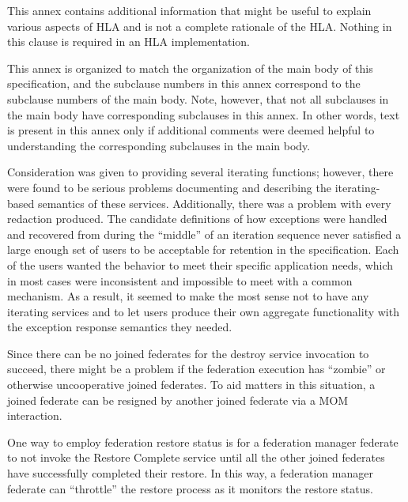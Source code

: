 
\clearpage

\begin{annexstdpage}


    This annex contains additional information that might be useful to explain various aspects of HLA and is not a complete rationale of the HLA. Nothing in this clause is required in an HLA implementation.

    This annex is organized to match the organization of the main body of this specification, and the subclause numbers in this annex correspond to the subclause numbers of the main body. Note, however, that not all subclauses in the main body have corresponding subclauses in this annex. In other words, text is present in this annex only if additional comments were deemed helpful to understanding the corresponding subclauses in the main body.


    Consideration was given to providing several iterating functions; however, there were found to be serious problems documenting and describing the iterating-based semantics of these services. Additionally, there was a problem with every redaction produced. The candidate definitions of how exceptions were handled and recovered from during the ``middle'' of an iteration sequence never satisfied a large enough set of users to be acceptable for retention in the specification. Each of the users wanted the behavior to meet their specific application needs, which in most cases were inconsistent and impossible to meet with a common mechanism. As a result, it seemed to make the most sense not to have any iterating services and to let users produce their own aggregate functionality with the exception response semantics they needed.



    Since there can be no joined federates for the destroy service invocation to succeed, there might be a problem if the federation execution has ``zombie'' or otherwise uncooperative joined federates. To aid matters in this situation, a joined federate can be resigned by another joined federate via a MOM interaction.


    One way to employ federation restore status is for a federation manager federate to not invoke the Restore Complete service until all the other joined federates have successfully completed their restore. In this way, a federation manager federate can ``throttle'' the restore process as it monitors the restore status.
\end{annexstdpage}

